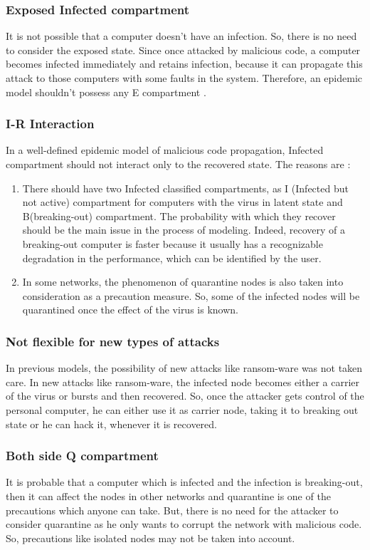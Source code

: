 \subsubsection{Exposed Infected compartment}
It is not possible that a computer doesn't have an infection. So, there is no need to consider the exposed state. Since once attacked by malicious code, a computer becomes infected
 immediately and retains infection, because it can propagate this attack to those computers with some faults in the system. Therefore, an epidemic  model shouldn't possess any E compartment \cite{edtr15}.
\subsubsection{I-R Interaction}
In a well-defined epidemic model of malicious code propagation, Infected compartment should not interact only to the recovered state. The reasons are :
\begin{enumerate}
  \item There should have two Infected classified compartments, as I (Infected but not active) compartment for computers with the virus in latent state and B(breaking-out) compartment. The probability with which they recover should be the main issue in the process of modeling. Indeed, recovery of a breaking-out computer is faster  because it usually has a recognizable degradation in the performance, which can be identified by the user.
  \item  In some networks, the phenomenon of quarantine nodes is also taken into consideration as a precaution measure. So, some of the infected nodes will be quarantined once the effect of the virus is known.
\end{enumerate}
\subsubsection{Not flexible for new types of attacks}
In previous models, the possibility of new attacks like ransom-ware was not taken care. In new attacks like ransom-ware, the infected node becomes either a carrier
 of the virus or bursts and then recovered. So, once the attacker gets control of the personal computer, he can either use it as carrier node, taking it to breaking out state or he can
 hack it, whenever it is recovered.
\subsubsection{Both side Q compartment}
It is probable that a computer which is infected and the infection is breaking-out, then it can affect the nodes in other networks and quarantine is one of the precautions
 which anyone can take. But, there is no need for the attacker to consider quarantine as he only wants to corrupt the network with malicious code. So,
 precautions like isolated nodes may not be taken into account.
